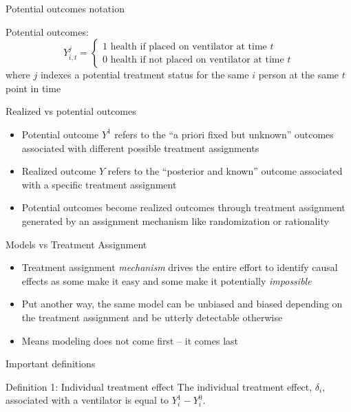 \documentclass{beamer}
\begin{document}
\begin{frame}{Potential outcomes notation}

Potential outcomes: $$Y_{i,t}^j =\begin{cases} 1 \text{ health if placed on ventilator at time $t$} \\ 0 \text{ health if not placed on ventilator at time $t$} \end{cases}$$where $j$ indexes a potential treatment status for the same $i$ person at the same $t$ point in time
\end{frame}


\begin{frame}{Realized vs potential outcomes}

  \begin{itemize}
    \item Potential outcome $Y^1$ refers to the ``a priori fixed but unknown'' outcomes associated with different possible treatment assignments
    \item Realized outcome $Y$ refers to the ``posterior and known'' outcome associated with a specific treatment assignment
    \item Potential outcomes become realized outcomes through treatment assignment generated by an assignment mechanism like randomization or rationality
  \end{itemize}
\end{frame}


\begin{frame}{Models vs Treatment Assignment}

\begin{itemize}
    \item Treatment assignment \emph{mechanism} drives the entire effort to identify causal effects as some make it easy and some make it potentially \emph{impossible}
	\item Put another way, the same model can be unbiased and biased depending on the treatment assignment and be utterly detectable otherwise
	\item Means modeling does not come first -- it comes last
	\end{itemize}
\end{frame}

\begin{frame}{Important definitions}

    \begin{block}{Definition 1: Individual treatment effect}
      The individual treatment effect,  $\delta_i$, associated with a ventilator is equal to $Y_i^1-Y_i^0$.
    \end{block}
\end{frame}
\end{document}
